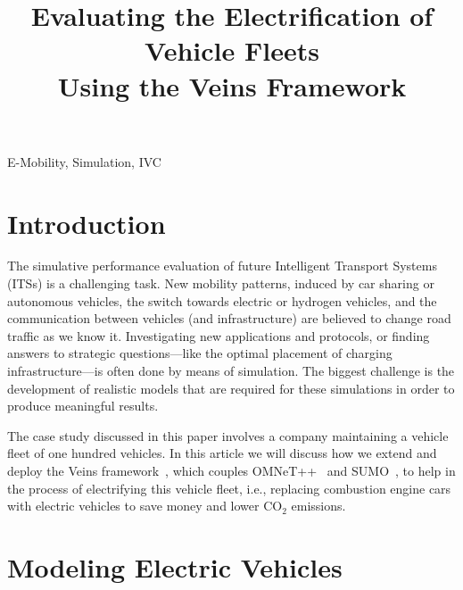 \documentclass[conference]{IEEEtran}
\begin{document}
\title{Evaluating the Electrification of Vehicle Fleets\\ Using the Veins Framework}


\author{
}








\maketitle

\begin{keywords}
E-Mobility, Simulation, IVC
\end{keywords}




\section{Introduction}

The simulative performance evaluation of future Intelligent
Transport Systems (ITSs) is a challenging task.
New mobility patterns, induced by car sharing or autonomous vehicles, the switch towards electric or hydrogen vehicles,
and the communication between vehicles (and infrastructure) are believed to change road traffic as we know it.
Investigating new applications and protocols, or finding answers to strategic questions---like the optimal placement of charging infrastructure---is often done by means of simulation.
The biggest challenge is the development of realistic models that are required for these simulations in order to produce meaningful results.

The case study discussed in this paper involves a company maintaining a vehicle fleet of one hundred vehicles.
In this article we will discuss how we extend and deploy the Veins framework~\cite{sommer2011bidirectionally}, which couples OMNeT++~\cite{varga2008overview} and SUMO~\cite{Krajzewicz2002}, to help in the process of electrifying this vehicle fleet, i.e., replacing combustion engine cars with electric vehicles to save money and lower CO$_2$ emissions.


\section{Modeling Electric Vehicles}
\end{document}
